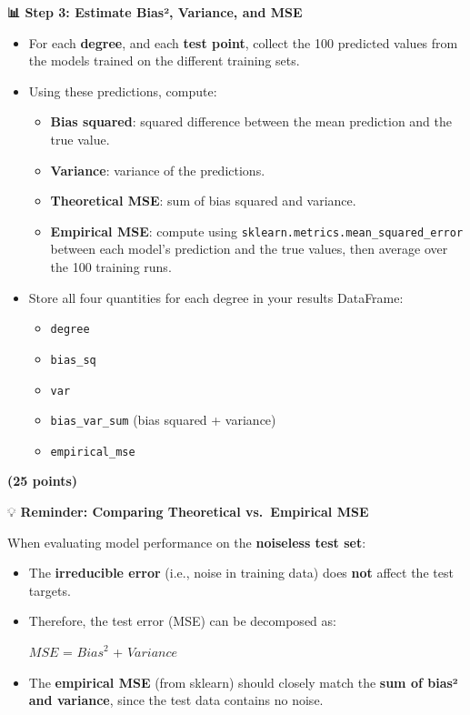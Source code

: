 \documentclass[
  letterpaper,
  DIV=11,
  numbers=noendperiod]{scrreprt}
\providecommand{\tightlist}{%
  \setlength{\itemsep}{0pt}\setlength{\parskip}{0pt}}\usepackage{longtable,booktabs,array}
\begin{document}
\textbf{📊 Step 3: Estimate Bias², Variance, and MSE}

\begin{itemize}
\tightlist
\item
  For each \textbf{degree}, and each \textbf{test point}, collect the
  100 predicted values from the models trained on the different training
  sets.
\item
  Using these predictions, compute:

  \begin{itemize}
  \tightlist
  \item
    \textbf{Bias squared}: squared difference between the mean
    prediction and the true value.
  \item
    \textbf{Variance}: variance of the predictions.
  \item
    \textbf{Theoretical MSE}: sum of bias squared and variance.
  \item
    \textbf{Empirical MSE}: compute using
    \texttt{sklearn.metrics.mean\_squared\_error} between each model's
    prediction and the true values, then average over the 100 training
    runs.
  \end{itemize}
\item
  Store all four quantities for each degree in your results DataFrame:

  \begin{itemize}
  \tightlist
  \item
    \texttt{degree}
  \item
    \texttt{bias\_sq}
  \item
    \texttt{var}
  \item
    \texttt{bias\_var\_sum} (bias squared + variance)
  \item
    \texttt{empirical\_mse}
  \end{itemize}
\end{itemize}

\textbf{(25 points)}

💡 \textbf{Reminder: Comparing Theoretical vs.~Empirical MSE}

When evaluating model performance on the \textbf{noiseless test set}:

\begin{itemize}
\item
  The \textbf{irreducible error} (i.e., noise in training data) does
  \textbf{not} affect the test targets.
\item
  Therefore, the test error (MSE) can be decomposed as:

  \(MSE\) = \({Bias}^2\) + \({Variance}\)
\item
  The \textbf{empirical MSE} (from sklearn) should closely match the
  \textbf{sum of bias² and variance}, since the test data contains no
  noise.
\end{itemize}
\end{document}
